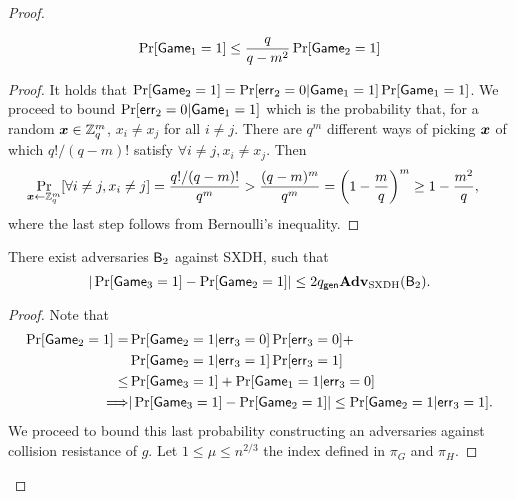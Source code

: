 \begin{proof}
\begin{lemma} 
$$
\Pr[\mathsf{Game}_1=1]\leq \frac{q}{q-m^2}\Pr[\mathsf{Game}_2=1]
$$
\end{lemma}
\begin{proof}
It holds that $\Pr[\mathsf{Game}_2=1] = \Pr[\mathsf{err}_2=0|\mathsf{Game}_1=1]\Pr[\mathsf{Game}_1=1]$. We proceed to bound $\Pr[\mathsf{err}_2=0|\mathsf{Game}_1=1]$ which is the probability that, for a random ${\boldsymbol{x}}\in\mathbb{Z}_q^m$, $x_i\neq x_j$ for all $i\neq j$.
There are $q^m$ different ways of picking ${\boldsymbol{x}}$ of which $q!/(q-m)!$ satisfy $\forall i\neq j, x_i\neq x_j$. Then
\begin{align*}
\Pr_{{\boldsymbol{x}}\gets\mathbb{Z}_q^m}[\forall i\neq j, x_i\neq j] & = \frac{q!/(q-m)!}{q^m} > \frac{(q-m)^m}{q^m} = \left(1-\frac{m}{q}\right)^m \geq 1-\frac{m^2}{q},
\end{align*}
where the last step follows from Bernoulli's inequality.
\end{proof}
\begin{lemma} There exist adversaries $\mathsf{B}_2$ against SXDH, such that
$$
|\Pr[\mathsf{Game}_3=1]-\Pr[\mathsf{Game}_2=1]|\leq 2q_\mathsf{gen}\mathbf{Adv}_\mathrm{SXDH}(\mathsf{B}_2).
$$\label{lemma:fin}
\end{lemma}
\begin{proof}
Note that
\begin{align*}
\Pr[\mathsf{Game}_2=1]
 = &\Pr[\mathsf{Game}_2=1|\mathsf{err}_3=0]\Pr[\mathsf{err}_3=0]+\\
&\Pr[\mathsf{Game}_2=1|\mathsf{err}_3=1]\Pr[\mathsf{err}_3=1]\\
 \leq& \Pr[\mathsf{Game}_3=1] + \Pr[\mathsf{Game}_1=1|\mathsf{err}_3=0]\\
\Longrightarrow  &|\Pr[\mathsf{Game}_3=1]-\Pr[\mathsf{Game}_2=1]|\leq \Pr[\mathsf{Game}_2=1|\mathsf{err}_3=1].
\end{align*}
We proceed to bound this last probability constructing an adversaries against collision resistance of $g$. Let $1\leq \mu\leq n^{2/3}$ the index defined in $\pi_G$ and $\pi_H$.



\end{proof}
\end{proof}
